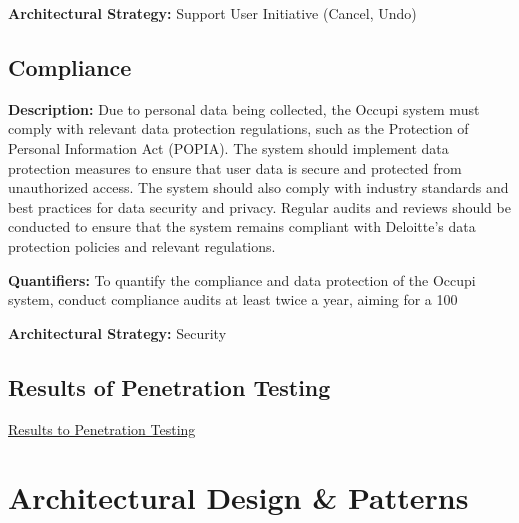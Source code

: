 \documentclass[11pt,a4paper]{article}
\begin{document}
\textbf{Architectural Strategy:} Support User Initiative (Cancel, Undo)

\subsection*{Compliance}
\textbf{Description:} Due to personal data being collected, the Occupi system must comply with relevant data protection regulations, such as the Protection of Personal Information Act (POPIA). The system should implement data protection measures to ensure that user data is secure and protected from unauthorized access. The system should also comply with industry standards and best practices for data security and privacy. Regular audits and reviews should be conducted to ensure that the system remains compliant with Deloitte’s data protection policies and relevant regulations.

\textbf{Quantifiers:} To quantify the compliance and data protection of the Occupi system, conduct compliance audits at least twice a year, aiming for a 100%

\textbf{Architectural Strategy:} Security

\subsection*{Results of Penetration Testing}
\href{https://drive.google.com/drive/folders/1iZRAiG3MAeO29Iqtde19l5mjX47NGkFP}{Results to Penetration Testing}

\pagebreak

\section*{Architectural Design \& Patterns}
\end{document}
